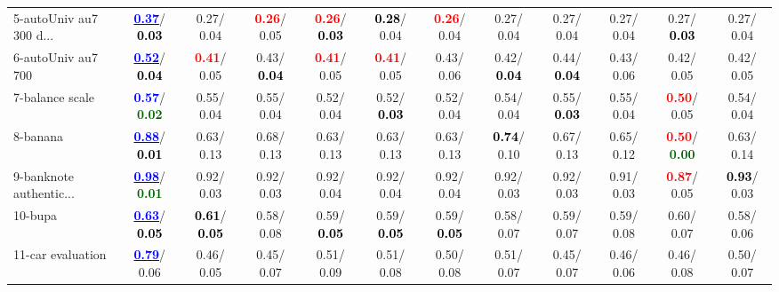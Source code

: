 \begin{table}[h]
\begin{center}
{\begin{tabular}{lc|c|c|c|c|c|c|c|c|c|c}
5-autoUniv au7 300 d... & \underline{\textcolor{blue}{\textbf{  0.37}}}/\textcolor{black}{\textbf{  0.03}} &   0.27/  0.04 & \textcolor{red}{\textbf{  0.26}}/  0.05 & \textcolor{red}{\textbf{  0.26}}/\textcolor{black}{\textbf{  0.03}} & \textcolor{black}{\textbf{  0.28}}/  0.04 & \textcolor{red}{\textbf{  0.26}}/  0.04 &   0.27/  0.04 &   0.27/  0.04 &   0.27/  0.04 &   0.27/\textcolor{black}{\textbf{  0.03}} &   0.27/  0.04 \\
6-autoUniv au7 700 & \underline{\textcolor{blue}{\textbf{  0.52}}}/\textcolor{black}{\textbf{  0.04}} & \textcolor{red}{\textbf{  0.41}}/  0.05 &   0.43/\textcolor{black}{\textbf{  0.04}} & \textcolor{red}{\textbf{  0.41}}/  0.05 & \textcolor{red}{\textbf{  0.41}}/  0.05 &   0.43/  0.06 &   0.42/\textcolor{black}{\textbf{  0.04}} &   0.44/\textcolor{black}{\textbf{  0.04}} &   0.43/  0.06 &   0.42/  0.05 &   0.42/  0.05 \\
7-balance scale & \textcolor{blue}{\textbf{  0.57}}/\textcolor{darkgreen}{\textbf{  0.02}} &   0.55/  0.04 &   0.55/  0.04 &   0.52/  0.04 &   0.52/\textcolor{black}{\textbf{  0.03}} &   0.52/  0.04 &   0.54/  0.04 &   0.55/\textcolor{black}{\textbf{  0.03}} &   0.55/  0.04 & \textcolor{red}{\textbf{  0.50}}/  0.05 &   0.54/  0.04 \\ \hline
8-banana & \underline{\textcolor{blue}{\textbf{  0.88}}}/\textcolor{black}{\textbf{  0.01}} &   0.63/  0.13 &   0.68/  0.13 &   0.63/  0.13 &   0.63/  0.13 &   0.63/  0.13 & \textcolor{black}{\textbf{  0.74}}/  0.10 &   0.67/  0.13 &   0.65/  0.12 & \textcolor{red}{\textbf{  0.50}}/\textcolor{darkgreen}{\textbf{  0.00}} &   0.63/  0.14 \\
9-banknote authentic... & \underline{\textcolor{blue}{\textbf{  0.98}}}/\textcolor{darkgreen}{\textbf{  0.01}} &   0.92/  0.03 &   0.92/  0.03 &   0.92/  0.04 &   0.92/  0.04 &   0.92/  0.04 &   0.92/  0.03 &   0.92/  0.03 &   0.91/  0.03 & \textcolor{red}{\textbf{  0.87}}/  0.05 & \textcolor{black}{\textbf{  0.93}}/  0.03 \\
10-bupa & \underline{\textcolor{blue}{\textbf{  0.63}}}/\textcolor{black}{\textbf{  0.05}} & \textcolor{black}{\textbf{  0.61}}/\textcolor{black}{\textbf{  0.05}} &   0.58/  0.08 &   0.59/\textcolor{black}{\textbf{  0.05}} &   0.59/\textcolor{black}{\textbf{  0.05}} &   0.59/\textcolor{black}{\textbf{  0.05}} &   0.58/  0.07 &   0.59/  0.07 &   0.59/  0.08 &   0.60/  0.07 &   0.58/  0.06 \\
11-car evaluation & \underline{\textcolor{blue}{\textbf{  0.79}}}/  0.06 &   0.46/  0.05 &   0.45/  0.07 &   0.51/  0.09 &   0.51/  0.08 &   0.50/  0.08 &   0.51/  0.07 &   0.45/  0.07 &   0.46/  0.06 &   0.46/  0.08 &   0.50/  0.07 \\

\end{tabular}}
\end{center}
\end{table}
